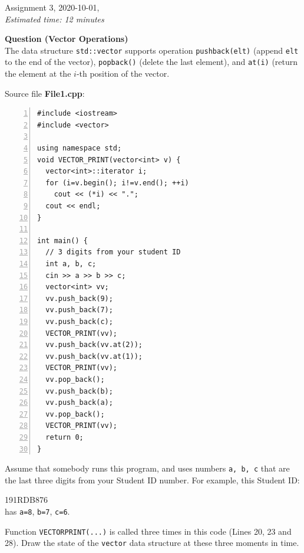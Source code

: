 \documentclass[11pt]{article}
\begin{document}
\thispagestyle{empty}

\twocolumn


\begin{center}
{\Large Assignment 3, 2020-10-01},\\
{\em Estimated time: 12 minutes}
\end{center}

\vspace{10pt}
{\bf Question (Vector Operations)}\\ The data structure {\tt std::vector} 
supports operation {\tt push\textunderscore{}back(elt)} (append {\tt elt} 
to the end of the vector), {\tt pop\textunderscore{}back()} (delete the last element), 
and {\tt at(i)} (return the element at the $i$-th position of the vector. 


\vspace{10pt}
Source file {\bf File1.cpp}:
{\footnotesize
\begin{center}
\begin{minipage}{.85\columnwidth}
\begin{Verbatim}[frame=single,numbers=left]
#include <iostream>
#include <vector>

using namespace std;
void VECTOR_PRINT(vector<int> v) {
  vector<int>::iterator i;
  for (i=v.begin(); i!=v.end(); ++i)
    cout << (*i) << ".";
  cout << endl;
}

int main() {
  // 3 digits from your student ID
  int a, b, c; 
  cin >> a >> b >> c;
  vector<int> vv;
  vv.push_back(9);
  vv.push_back(7);
  vv.push_back(c);
  VECTOR_PRINT(vv);
  vv.push_back(vv.at(2));
  vv.push_back(vv.at(1));
  VECTOR_PRINT(vv);
  vv.pop_back();
  vv.push_back(b);
  vv.push_back(a);
  vv.pop_back();
  VECTOR_PRINT(vv);
  return 0;
}
\end{Verbatim}
\end{minipage}
\end{center}
}


Assume that somebody runs this program, and 
uses numbers {\tt a, b, c} 
that are the last three digits from your Student ID number. 
For example, this Student ID:

\vspace{2pt}
{\LARGE 191RDB876}\\
has {\tt a=8}, {\tt b=7}, {\tt c=6}.

\vspace{10pt}
Function {\tt VECTOR\textunderscore{}PRINT(...)} is called three times in 
this code (Lines 20, 23 and 28). 
Draw the state of the {\tt vector} data structure at these three moments in time.
\end{document}
